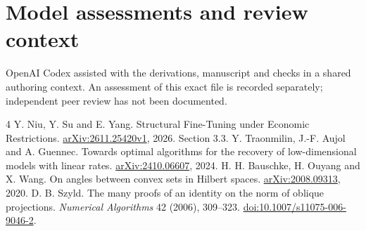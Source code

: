 \documentclass[11pt]{article}
\begin{document}
\section*{Model assessments and review context}
OpenAI Codex assisted with the derivations, manuscript and checks in a shared authoring context. An assessment of this exact file is recorded separately; independent peer review has not been documented.

\begin{thebibliography}{4}\setlength{\itemsep}{1pt}
 Y. Niu, Y. Su and E. Yang. Structural Fine-Tuning under Economic Restrictions. \href{https://arxiv.org/abs/2611.25420v1}{arXiv:2611.25420v1}, 2026. Section 3.3.
 Y. Traonmilin, J.-F. Aujol and A. Guennec. Towards optimal algorithms for the recovery of low-dimensional models with linear rates. \href{https://arxiv.org/abs/2410.06607}{arXiv:2410.06607}, 2024.
 H. H. Bauschke, H. Ouyang and X. Wang. On angles between convex sets in Hilbert spaces. \href{https://arxiv.org/abs/2008.09313}{arXiv:2008.09313}, 2020.
 D. B. Szyld. The many proofs of an identity on the norm of oblique projections. \emph{Numerical Algorithms} 42 (2006), 309--323. \href{https://doi.org/10.1007/s11075-006-9046-2}{doi:10.1007/s11075-006-9046-2}.
\end{thebibliography}
\end{document}
